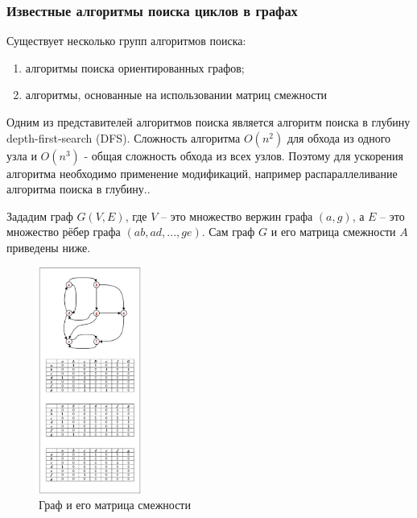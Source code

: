 \def\notedate{2021.11.14}
\def\currentauthor{Муха В. (РК6-73Б)}

\subsubsection{Известные алгоритмы поиска циклов в графах}

Существует несколько групп алгоритмов поиска\cite{davidrajuh2016}:
\begin{enumerate}[label=\arabic*)]
    \item алгоритмы поиска ориентированных графов;
    \item алгоритмы, основанные на использовании матриц смежности
\end{enumerate}

Одним из представителей алгоритмов поиска является алгоритм поиска в глубину depth-first-search (DFS). Сложность алгоритма $O(n^2)$ для обхода из одного узла и $O(n^3)$ - общая сложность обхода из всех узлов. Поэтому для ускорения алгоритма необходимо применение модификаций, например распараллеливание алгоритма поиска в глубину.\cite{Mahdi2011}.

Зададим граф $G(V, E)$, где $V$ -- это множество вержин графа $(a, g)$, а $E$ -- это множество рёбер графа $(ab, ad, ... , ge)$. Сам граф $G$ и его матрица смежности $A$ приведены ниже.

\begin{figure}[H]
	\centering
	\includegraphics[width=0.3\textwidth]{ResearchNotes/rndhpc_not_edt_2021_11_14/adj_matrix.png}
	\caption{Граф и его матрица смежности} 
\end{figure}

